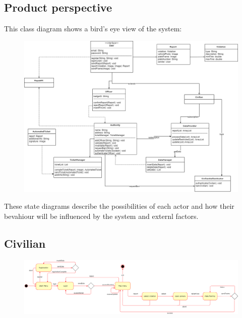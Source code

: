\documentclass[12pt,a4paper]{article}
\begin{document}
\subsection{Product	perspective} 
This class diagram shows a bird's eye view of the system:
\begin{figure}[H]
				\centering
					\begin{adjustwidth}{-25mm}{-25mm}
					        \includegraphics[width=.9\paperwidth,keepaspectratio]{Images/class_diagram}
					\end{adjustwidth}
				\label{fig:automated_request_sequence}
			\end{figure}
\newpage
These state diagrams describe the possibilities of each actor and how their bevahiour will be influenced by the system and externl factors.
	\subsection{Civilian}
			\begin{figure}[H]
				\centering
					\begin{adjustwidth}{-25mm}{-25mm}
					        \includegraphics[width=.9\paperwidth,keepaspectratio]{Images/civilian_states}
					\end{adjustwidth}
				\label{fig:automated_request_sequence}
			\end{figure}
\end{document}
